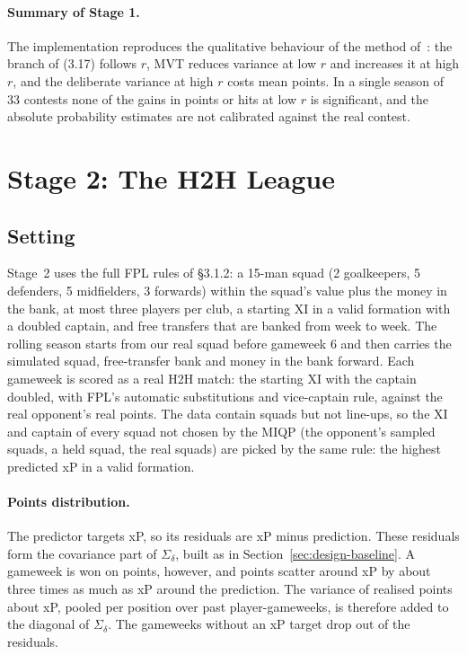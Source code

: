 \paragraph{Summary of Stage 1.} The implementation reproduces the qualitative behaviour of the
method of~\cite{haugh2021}: the branch of (3.17) follows $r$, MVT reduces variance at low $r$
and increases it at high $r$, and the deliberate variance at high $r$ costs mean points. In a
single season of 33 contests none of the gains in points or hits at low $r$ is significant,
and the absolute probability estimates are not calibrated against the real contest.

\section{Stage 2: The H2H League}
\label{sec:s2}

\subsection{Setting}
\label{sec:s2-setting}

Stage~2 uses the full FPL rules of §3.1.2: a 15-man squad (2 goalkeepers, 5 defenders, 5
midfielders, 3 forwards) within the squad's value plus the money in the bank, at most three
players per club, a starting XI in a valid formation with a doubled captain, and free transfers
that are banked from week to week. The rolling season starts from our real squad before
gameweek 6 and then carries the simulated squad, free-transfer bank and money in the bank
forward. Each gameweek is scored as a real H2H match: the starting XI with the captain doubled,
with FPL's automatic substitutions and vice-captain rule, against the real opponent's real
points. The data contain squads but not line-ups, so the XI and captain of every squad not
chosen by the MIQP (the opponent's sampled squads, a held squad, the real squads) are picked by
the same rule: the highest predicted xP in a valid formation.

\paragraph{Points distribution.} The predictor targets xP, so its residuals are xP minus
prediction. These residuals form the covariance part of $\Sigma_\delta$, built as in
Section~\ref{sec:design-baseline}. A gameweek is won on points, however, and points scatter
around xP by about three times as much as xP around the prediction. The variance of realised
points about xP, pooled per position over past player-gameweeks, is therefore added to the
diagonal of $\Sigma_\delta$. The gameweeks without an xP target drop out of the residuals.

